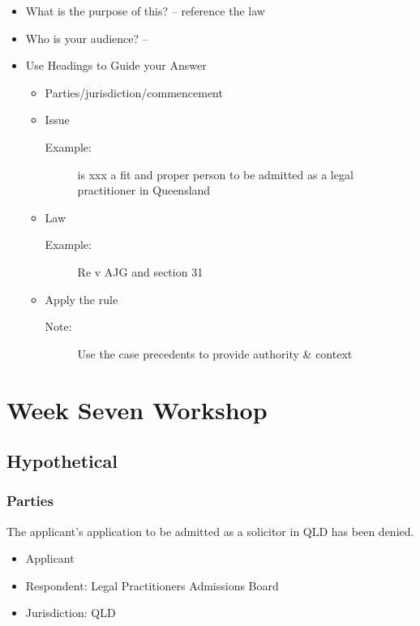 \begin{itemize}
    \item What is the purpose of this? -- reference the law
    \item Who is your audience? --
    \item Use Headings to Guide your Answer
        \begin{itemize}
            \item Parties/jurisdiction/commencement
            \item Issue
                \begin{description}
                    \item[Example:] is xxx a fit and proper person to be admitted as a legal practitioner in Queensland 
                \end{description}
            \item Law 
                \begin{description}
                    \item[Example:] Re v AJG and section 31
                \end{description}
            \item Apply the rule
                \begin{description}
                    \item[Note:] Use the case precedents to provide authority \& context 
                \end{description}
        \end{itemize}
\end{itemize}

\section*{Week Seven Workshop}

\subsection*{Hypothetical}

\subsubsection*{Parties}
The applicant's application to be admitted as a solicitor in QLD has been denied. 
\begin{itemize}
    \item Applicant
    \item Respondent: Legal Practitioners Admissions Board
    \item Jurisdiction: QLD
\end{itemize}

